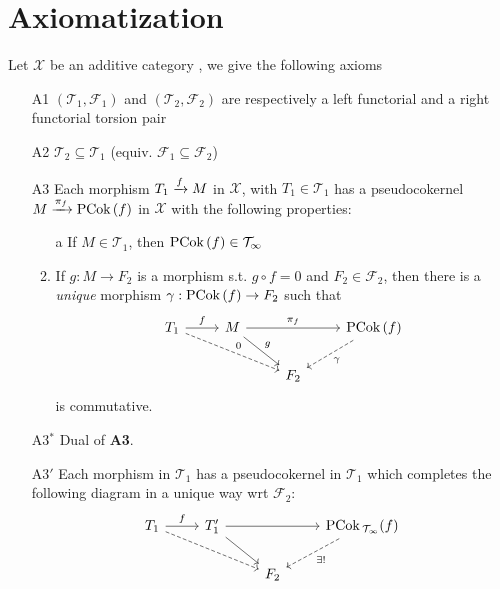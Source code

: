 \clearpage

\section{Axiomatization}

Let $\mathcal{X}$ be an additive category , we give the following axioms

\begin{enumerate}
  \item[A1] $(\mathcal{T}_1,\mathcal{F}_1)$ and $(\mathcal{T}_2,\mathcal{F}_2)$ are respectively a left functorial and a
  right functorial torsion pair 
  \item[A2] $\mathcal{T}_2\subseteq \mathcal{T}_1$ (equiv. $\mathcal{F}_1\subseteq\mathcal{F}_2$)
  \item[A3] Each morphism $T_1\xrightarrow{f}M$ in $\mathcal{X}$, with $T_1\in\mathcal{T}_1$ has a pseudocokernel
  $M\xrightarrow{\pi_f}\mathrm{\textup{PCok\,}} (f)$ in $\mathcal{X}$ with the following properties:
  \begin{enumerate}
    \item[a] If $M\in\mathcal{T}_1$, then $\mathrm{\textup{PCok\,}}(f) \in\mathcal{T_1}$
    \item If $g:M\to F_2$ is a morphism s.t. $g\circ f=0$ and $F_2\in\mathcal{F}_2$, then there is a
    \emph{unique} morphism $\gamma:\mathrm{\textup{PCok\,}}(f)\to F_2$ such that
    \begin{equation*}
      \begin{tikzcd}
        T_1\arrow{r}{f}\arrow[dashed]{drr}{0}
          & M\arrow{rr}{\pi_f}\arrow{dr}{g}
            & & \PCok(f)\arrow[dashed]{dl}{\gamma} \\
          & & F_2
              &
      \end{tikzcd}
    \end{equation*}
    is commutative.
  \end{enumerate}
  \item[A3$^*$] Dual of \textbf{A3}.
  \item[A3$'$] Each morphism in $\mathcal{T}_1$ has a pseudocokernel in $\mathcal{T}_1$ which completes the following
  diagram in a unique way wrt $\mathcal{F}_2$:
  \begin{equation*}
    \begin{tikzcd}
      T_1\arrow{r}{f}\arrow[dashed]{drr}
        & T_1'\arrow{dr}\arrow{rr}
          & & \PCok_\mathcal{T_1}(f)\arrow[dashed]{dl}{\exists!} \\
        & & F_2
            &
    \end{tikzcd}
  \end{equation*}
\end{enumerate}

